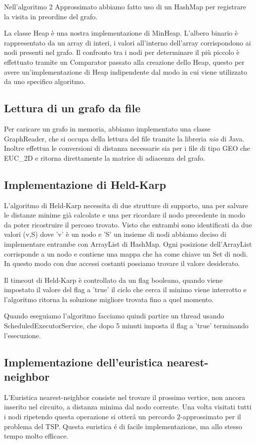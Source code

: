 Nell'algoritmo 2 Approssimato abbiamo fatto uso di un HashMap per registrare la visita in preordine del grafo.

La classe Heap è una nostra implementazione di MinHeap. L'albero binario è rappresentato da un array di interi, i valori all'interno dell'array corrispondono ai nodi presenti nel grafo. Il confronto tra i nodi per determinare il più piccolo è effettuato tramite un Comparator passato alla creazione dello Heap, questo per avere un'implementazione di Heap indipendente dal modo in cui viene utilizzato da uno specifico algoritmo.
\subsection{Lettura di un grafo da file}
Per caricare un grafo in memoria, abbiamo implementato una classe GraphReader, che si occupa della lettura del file tramite la libreria \textit{nio} di Java. Inoltre effettua le conversioni di distanza necessarie sia per i file di tipo GEO che EUC\_2D e ritorna direttamente la matrice di adiacenza del grafo.


\subsection{Implementazione di Held-Karp}

L'algoritmo di Held-Karp necessita di due strutture di supporto, una per salvare le distanze minime già calcolate e una per ricordare il nodo precedente in modo da poter ricostruire il percoso trovato. Visto che entrambi sono identificati da due valori (v,S) dove 'v' è un nodo e 'S' un insieme di nodi abbiamo deciso di implementare entrambe con ArrayList di HashMap. Ogni posizione dell'ArrayList corrisponde a un nodo e contiene una mappa che ha come chiave un Set di nodi. In questo modo con due accessi costanti possiamo trovare il valore desiderato.

Il timeout di Held-Karp è controllato da un flag booleano, quando viene impostato il valore del flag a 'true' il ciclo che cerca il minimo viene interrotto e l'algoritmo ritorna la soluzione migliore trovata fino a quel momento.

Quando eseguiamo l'algoritmo facciamo quindi partire un thread usando ScheduledExecutorService, che dopo 5 minuti imposta il flag a 'true' terminando l'esecuzione.

\subsection{Implementazione dell'euristica nearest-neighbor}
L'Euristica nearest-neighbor consiste nel trovare il prossimo vertice, non ancora inserito nel circuito, a distanza minima dal nodo corrente. Una volta visitati tutti i nodi
ripetendo questa operazione si otter\'a un percordo 2-approssimato per il problema del TSP. Questa euristica \'e di facile implementazione, ma allo stesso tempo molto efficace.

